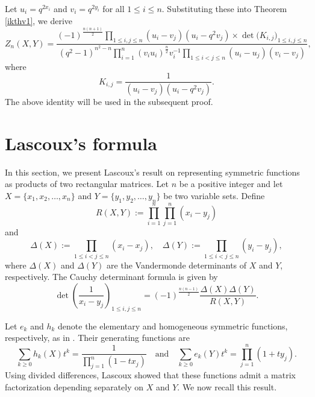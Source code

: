 \documentclass[12pt, a4paper]{amsart} %
\numberwithin{equation}{section}
\newtheorem{theorem}{Theorem}[section]
\begin{document}
Let $u_i=q^{2x_i}$ and $v_i=q^{2y_i}$ for all $1 \leq i \leq n$. Substituting these into Theorem \ref{ikthv1}, we derive 
\begin{equation}\label{zuvv2}
        Z_n(X,Y)=\frac{(-1)^{\frac{n(n+1)}{2}}\prod_{1 \leq i,j \leq n}(u_i-v_j)(u_i-q^2v_j)
				\times 
\det{\bigl(K_{i,j}\bigr)_{1 \le i,j \le n}}
				}{(q^2-1)^{n^2-n}\prod_{i=1}^{n}(v_iu_i)^{\frac{n}{2}}v_i^{-1}\prod_{1 \leq i <j \leq n}(u_i-u_j)(v_i-v_j)},
\end{equation}
where 
$$K_{i,j}=\frac{1}{(u_i-v_j)(u_i-q^2v_j)}.$$
The above identity will be used in the subsequent proof.
% 
% 


\section{Lascoux's formula}\label{sec:Lascoux} %

In this section, we present Lascoux’s result on representing symmetric functions as products of two rectangular matrices. 
Let $n$ be a positive integer and let  $X = \{x_1, x_2, \dots, x_{n}\}$ and $Y = \{y_1, y_2, \dots, y_{n}\}$ be two variable sets.
Define
$$R(X,Y):=\prod_{i=1}^{n}\prod_{j=1}^{n}(x_i-y_j)$$
and 
$$
\Delta(X):=\prod_{1 \leq i<j \leq n}(x_i-x_j), \quad \Delta(Y):=\prod_{1 \leq i<j \leq n}(y_i-y_j),
$$
where $\Delta(X)$ and $\Delta(Y)$ are the Vandermonde determinants of $X$ and $Y$, respectively.
The Cauchy determinant formula is given by 
$$\det{\left(\frac{1}{x_i-y_j}\right)}_{1 \le i,j \le n}=(-1)^{\frac{n(n-1)}{2}}\frac{\Delta(X)\Delta(Y)}{R(X,Y)}.$$

Let $e_k$ and $h_k$ denote the elementary and homogeneous symmetric functions, respectively, as in \cite{Macdonald1995}. 
Their generating functions are
$$
	\sum_{k\geq 0} h_k(X) t^k = \frac{1}{\prod_{j=1}^n (1-tx_j)} \quad \text{and}\quad
	\sum_{k\geq 0} e_k(Y) t^k = \prod_{j=1}^n (1+ty_j).
$$
Using divided differences, Lascoux \cite{La99} showed that these functions admit a matrix factorization depending separately on $X$ and $Y$. We now recall this result.
\end{document}
